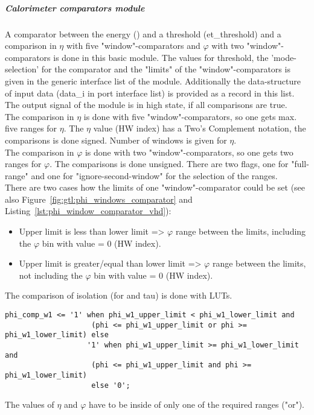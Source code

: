 \subparagraph{Calorimeter comparators module}\label{sec:gtl:calo_comp_module}
A comparator between the energy (\et) and a threshold (et\_threshold) and a comparison in $\eta$ with five "window"-comparators and $\varphi$ with two "window"-comparators
is done in this basic module. The values for \et threshold, the 'mode-selection' for the \et comparator and the "limits" of the "window"-comparators is given in the generic interface list of the module. Additionally the data-structure of input data (data\_i in port interface list) is provided as a record in this list. The output signal of the module is in high state, if all comparisons are true.\\
The comparison in $\eta$ is done with five "window"-comparators, so one gets max. five ranges for $\eta$. The $\eta$ value (HW index) has a Two's Complement notation, the comparisons is done signed. Number of windows is given for $\eta$.\\
The comparison in $\varphi$ is done with two "window"-comparators, so one gets two ranges for $\varphi$. The comparisons is done unsigned. There are two flags, one for "full-range" and one for "ignore-second-window" for the selection of the ranges.\\
There are two cases how the limits of one "window"-comparator could be set (see also Figure~\ref{fig:gtl:phi_windows_comparator} and Listing~\ref{lst:phi_window_comparator_vhd}):
\begin{itemize}
\item Upper limit is less than lower limit => $\varphi$ range between the limits, including the $\varphi$ bin with value = 0 (HW index).
\item Upper limit is greater/equal than lower limit => $\varphi$ range between the limits, not including the $\varphi$ bin with value = 0 (HW index).
\end{itemize}
The comparison of isolation (for \egamma and tau) is done with LUTs.
\begin{lstlisting}[label=lst:phi_window_comparator_vhd,float=here,caption=VHDL code of "window"-comparator in $\varphi$,captionpos=t]
    phi_comp_w1 <= '1' when phi_w1_upper_limit < phi_w1_lower_limit and
                    (phi <= phi_w1_upper_limit or phi >= phi_w1_lower_limit) else
                   '1' when phi_w1_upper_limit >= phi_w1_lower_limit and
                    (phi <= phi_w1_upper_limit and phi >= phi_w1_lower_limit)
                    else '0';
\end{lstlisting}

The values of $\eta$ and $\varphi$ have to be inside of only one of the required ranges ("or").

